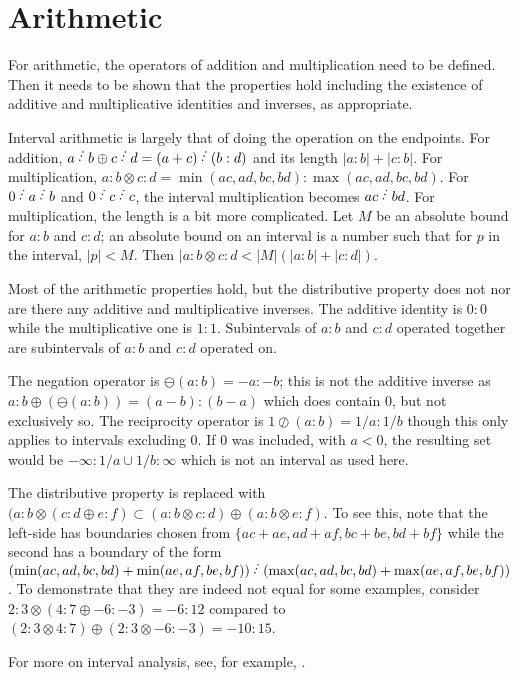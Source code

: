 \documentclass[12pt]{article}
\begin{document}
\section{Arithmetic}

For arithmetic, the operators of addition and multiplication need to be defined. Then it needs to be shown that the properties hold including the existence of additive and multiplicative identities and inverses, as appropriate. 

Interval arithmetic is largely that of doing the operation on the endpoints. For addition, $a \lte b \oplus c \lte d = (a+c) \lte (b:d)$ and its length $|a:b|+|c:b|$. For multiplication, $a:b \otimes c:d = \min(ac, ad, bc, bd):\max(ac, ad, bc, bd)$. For $0 \lte a \lte b$ and $0 \lte c \lte c$, the interval multiplication becomes $ac \lte bd$. For multiplication, the length is a bit more complicated. Let $M$ be an absolute bound for $a:b$ and $c:d$; an absolute bound on an interval is a number such that for $p$ in the interval, $|p| < M$. Then $|a:b \otimes c:d < |M|(|a:b| + |c:d|)$. 

Most of the arithmetic properties hold, but the distributive property does not nor are there any additive and multiplicative inverses. The additive identity is $0:0$ while the multiplicative one is $1:1$. Subintervals of $a:b$ and $c:d$ operated together are subintervals of $a:b$ and $c:d$ operated on. 

The negation operator is $\ominus(a:b) = -a:-b$; this is not the additive inverse as $a:b \oplus (\ominus(a :b )) = (a-b):(b-a)$ which does contain 0, but not exclusively so. The reciprocity operator is $1 \oslash (a:b) = 1/a : 1/b$ though this only applies to intervals excluding 0. If 0 was included, with $a < 0$, the resulting set would be $-\infty:1/a \cup 1/b : \infty $ which is not an interval as used here.

The distributive property is replaced with $( a:b \otimes ( c:d \oplus e:f) \subset (a:b \otimes c:d) \oplus (a:b \otimes e:f)$. To see this, note that the left-side has boundaries chosen from $\{ac+ae, ad+af, bc+be, bd+bf\}$ while the second has a boundary of the form $(\min(ac, ad, bc, bd) + \min(ae, af, be, bf) ) \lte (\max(ac, ad, bc, bd) + \max(ae, af, be, bf) )$. To demonstrate that they are indeed not equal for some examples, consider $2:3 \otimes ( 4:7 \oplus -6:-3) = -6:12$ compared to $(2:3 \otimes 4:7) \oplus (2:3 \otimes -6:-3) = -10:15$. 

For more on interval analysis, see, for example, \cite{moore}.
\end{document}
